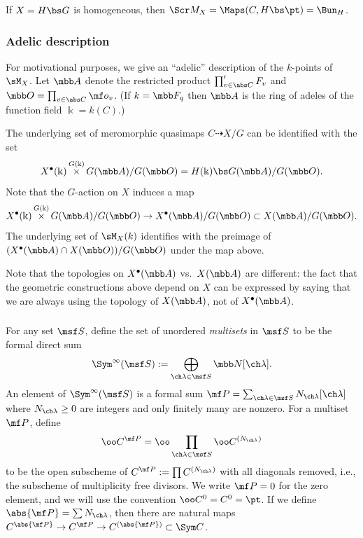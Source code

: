 \documentclass[final]{amsart}
\theoremstyle{remark}
\theoremstyle{definition}
\DeclareMathOperator*{\xt}{\times}
\numberwithin{equation}{section}
\begin{document}
If $X = H\bs G$ is homogeneous, then $\Scr M_X = \Maps(C,H\bs \pt) = \Bun_H$. 

\subsubsection{Adelic description} \label{sect:adelic}
For motivational purposes, we give an ``adelic'' description of the $k$-points of 
$\sM_X$. 
Let $\mbb A$ denote the restricted product $\prod'_{v\in \abs C} F_v$ and 
$\mbb O = \prod_{v\in \abs C} \mf o_v$. 
(If $k=\mbb F_q$ then $\mbb A$ is the ring of adeles of the function field $\Bbbk = k(C)$.)

The underlying set of meromorphic quasimaps $C \dashrightarrow X/G$ 
can be identified with the set
\[ X^\bullet(\Bbbk) \xt^{G(\Bbbk)} G(\mbb A) / G(\mbb O) 
= H(\Bbbk) \bs G(\mbb A) / G(\mbb O). 
\]
Note that the $G$-action on $X$ induces a map 
\[ X^\bullet(\Bbbk) \xt^{G(\Bbbk)} G(\mbb A) / G(\mbb O) \to X^\bullet(\mbb A)/G(\mbb O) \subset X(\mbb A)/G(\mbb O). 
\]
The underlying set of $\sM_X(k)$ identifies with 
the preimage of $(X^\bullet(\mbb A) \cap X(\mbb O)) / G(\mbb O)$ under the map above.

\medskip

Note that the topologies on $X^\bullet(\mbb A)$ vs.~$X(\mbb A)$ are different: the
fact that the geometric constructions above depend on $X$ can be expressed
by saying that we are always using the topology of $X(\mbb A)$, not of $X^\bullet(\mbb A)$.



\subsubsection{} \label{def:partition}
For any set $\msf S$, define the set of unordered \emph{multisets} in
$\msf S$ to be the formal direct sum
\[ \Sym^\infty(\msf S) := \bigoplus_{\ch\lambda\in \msf S} \mbb N[\ch\lambda]. \] 
An element of $\Sym^\infty(\msf S)$ is a 
formal sum $\mf P = \sum_{\ch\lambda \in \msf S} N_{\ch\lambda}[\ch\lambda]$
where $N_{\ch\lambda}\ge 0$ are integers and only finitely many 
are nonzero. 
For a multiset $\mf P$, define 
\[ \oo C^{\mf P} = \oo \prod_{\ch\lambda \in \msf S} \oo C^{(N_{\ch\lambda})}
\]
to be the open subscheme of $C^{\mf P}:=\prod C^{(N_{\ch\lambda})}$ 
with all diagonals
removed, i.e., the subscheme of multiplicity free divisors.
We write $\mf P=0$ for the zero element, and we will use the 
convention $\oo C^{0}=C^{0}=\pt$. 
If we define $\abs{\mf P} = \sum N_{\ch\lambda}$, then there are 
natural maps $C^{\abs{\mf P}} \to C^{\mf P} \to C^{(\abs{\mf P})} \subset \Sym C$.
\end{document}
